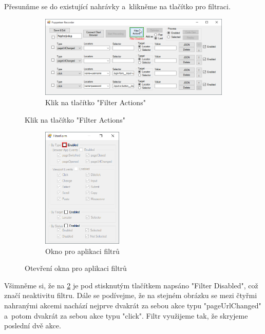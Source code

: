 \documentclass[12pt, a4paper, twoside]{article}
\begin{document}
	Přesunňme se do existující nahrávky a~klikněme na tlačítko pro filtraci.
	\begin{figure}[H]
		\centering
		\begin{subfigure}[t]{1.0\textwidth}
			\centering
			\includegraphics[width=1.0\textwidth]{filterActionsClick.png}
			\caption{Klik na tlačítko "Filter Actions"}
			\label{subfig:editFilterActions}
		\end{subfigure}
	\end{figure}
	\vspace{-0.7cm}
	\begin{figure}[H]\ContinuedFloat
		\centering
		\textdownarrow
	\end{figure}
	\vspace{-0.6cm}
	\begin{figure}[H]\ContinuedFloat
		\centering
		\begin{subfigure}[t]{1.0\textwidth}
			\centering
			\includegraphics[width=0.42\textwidth]{filterFormJustRun.png}
			\caption{Okno pro aplikaci filtrů}
			\label{subfig:filterForm}
		\end{subfigure}
		\caption{Otevření okna pro aplikaci filtrů}
	\end{figure}
	Všimněme si, že na \cref{subfig:editFilterActions} je pod stisknutým tlačítkem napsáno "Filter Disabled", což značí neaktivitu filtru. Dále se podívejme, že na stejném obrázku se mezi čtyřmi nahranými akcemi nachází nejprve dvakrát za sebou akce typu "pageUrlChanged" a~potom dvakrát za sebou akce typu "click". Filtr využijeme tak, že skryjeme poslední dvě akce.
	
\end{document}

